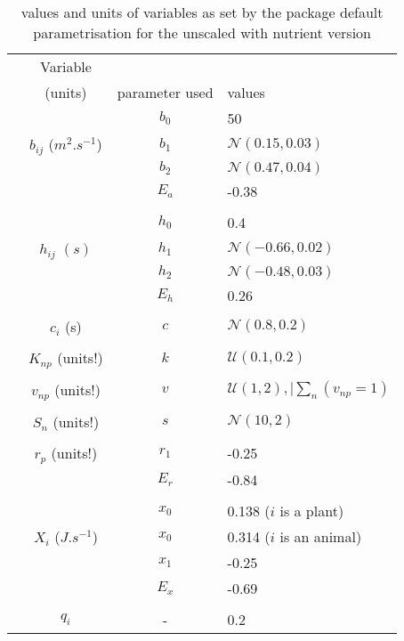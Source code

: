 \documentclass[12pt,a4paper]{article}
\begin{document}
\begin{table}[!htb]
    \centering
    \begin{tabular}{c@{\qquad}ccl}
        \toprule
           & Variable \\ &(units) & parameter used & values \\
        \midrule
        &                         & $b_0$ & 50 \\
        & $b_{ij}$ ($m^2.s^{-1}$) & $b_1$ &  $\mathcal{N}(0.15,0.03)$ \\
        &                         & $b_2$ &  $\mathcal{N}(0.47,0.04)$ \\
        &                         & $E_a$ &  -0.38 \\
        \\
        &                         & $h_0$ & 0.4 \\
        & $h_{ij}$  $(s)$         & $h_1$ & $\mathcal{N}(-0.66,0.02)$ \\
        &                         & $h_2$ & $\mathcal{N}(-0.48,0.03)$ \\
        &                         & $E_h$ &  0.26 \\
        \\
        &    $c_i$  (s)           & $c$   & $\mathcal{N}(0.8,0.2)$ \\
        \\
        &    $K_{np}$  (units!)   & $k$  & $\mathcal{U}(0.1,0.2)$ \\
        \\
        &    $v_{np}$  (units!)   & $v$  & $\mathcal{U}(1,2), \mid \sum_n(v_{np} = 1)$ \\
        \\
        &    $S_{n}$  (units!)   & $s$  & $\mathcal{N}(10,2)$ \\
        \\
        &    $r_p$  (units!)      & $r_1$  & -0.25 \\
        &                         & $E_r$  & -0.84 \\
        \\
        &                         & $x_0$             & 0.138 ($i$ is a plant)\\
        &    $X_i$  ($J.s^{-1}$)          & $x_0$     & 0.314 ($i$ is an animal)\\
        &                         & $x_1$             & -0.25\\
        &                         & $E_x$             & -0.69 \\
        \\
        & $q_i$                   & -                   & 0.2 \\

        \midrule
    \end{tabular}
    \caption{values and units of variables as set by the package default parametrisation for the unscaled with nutrient version}
    \label{tab:schneider_param_values}
\end{table}



\end{document}
